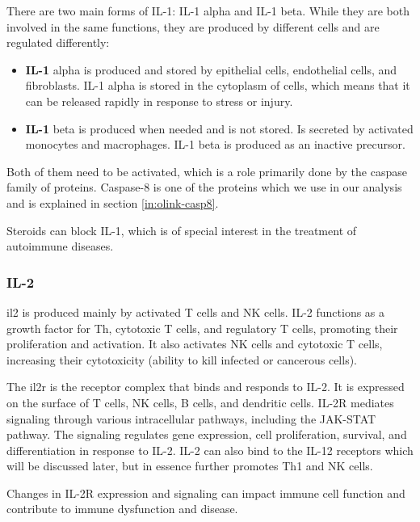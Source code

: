 There are two main forms of IL-1: IL-1 alpha and IL-1 beta. While they are both involved in the same functions, they are produced by different cells and are regulated differently:

\begin{itemize}

    \item {\textbf{IL-1}} alpha is produced and stored by epithelial cells, endothelial cells, and fibroblasts. IL-1 alpha is stored in the cytoplasm of cells, which means that it can be released rapidly in response to stress or injury.
    
    \item {\textbf{IL-1}} beta is produced when needed and is not stored. Is secreted by activated monocytes and macrophages. IL-1 beta is produced as an inactive precursor.

\end{itemize}

Both of them need to be activated, which is a role primarily done by the caspase family of proteins. Caspase-8 is one of the proteins which we use in our analysis and is explained in section \ref{in:olink-casp8}.

Steroids can block IL-1, which is of special interest in the treatment of autoimmune diseases.

\subsubsection{IL-2}
\label{in:IL2}

\gls{il2} is produced mainly by activated T cells and NK cells. IL-2 functions as a growth factor for Th, cytotoxic T cells, and regulatory T cells, promoting their proliferation and activation. It also activates NK cells and cytotoxic T cells, increasing their cytotoxicity (ability to kill infected or cancerous cells).

The \gls{il2r} is the receptor complex that binds and responds to IL-2. It is expressed on the surface of T cells, NK cells, B cells, and dendritic cells. IL-2R mediates signaling through various intracellular pathways, including the JAK-STAT pathway. The signaling regulates gene expression, cell proliferation, survival, and differentiation in response to IL-2. IL-2 can also bind to the IL-12 receptors which will be discussed later, but in essence further promotes Th1 and NK cells.

Changes in IL-2R expression and signaling can impact immune cell function and contribute to immune dysfunction and disease.

